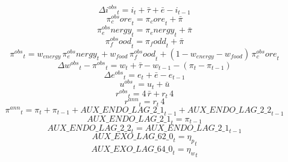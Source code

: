 \begin{dmath}
{{\Delta i^{obs}}}_{t}={{i}}_{t}+{{\bar{\tau}}}+{{\bar{e}}}-{{i}}_{t-1}
\end{dmath}
\begin{dmath}
{{\pi^{obs}_core}}_{t}={{\pi_core}}_{t}+{{\bar{\pi}}}
\end{dmath}
\begin{dmath}
{{\pi^{obs}_energy}}_{t}={{\pi_energy}}_{t}+{{\bar{\pi}}}
\end{dmath}
\begin{dmath}
{{\pi^{obs}_food}}_{t}={{\pi_fodd}}_{t}+{{\bar{\pi}}}
\end{dmath}
\begin{dmath}
{{\pi^{obs}}}_{t}={{w_{energy}}}\, {{\pi^{obs}_energy}}_{t}+{{w_{food}}}\, {{\pi^{obs}_food}}_{t}+\left(1-{{w_{energy}}}-{{w_{food}}}\right)\, {{\pi^{obs}_core}}_{t}
\end{dmath}
\begin{dmath}
{{\Delta w^{obs}}}_{t}-{{\pi^{obs}}}_{t}={{w}}_{t}+{{\bar{\tau}}}-{{w}}_{t-1}-\left({{\pi}}_{t}-{{\pi}}_{t-1}\right)
\end{dmath}
\begin{dmath}
{{\Delta e^{obs}}}_{t}={{e}}_{t}+{{\bar{e}}}-{{e}}_{t-1}
\end{dmath}
\begin{dmath}
{{u^{obs}}}_{t}={{u}}_{t}+{{\bar{u}}}
\end{dmath}
\begin{dmath}
{{r^{obs}}}_{t}=4\, {{\bar{r}}}+{{r}}_{t}\, 4
\end{dmath}
\begin{dmath}
{{r^{ann}}}_{t}={{r}}_{t}\, 4
\end{dmath}
\begin{dmath}
{{\pi^{ann}}}_{t}={{\pi}}_{t}+{{\pi}}_{t-1}+{AUX\_ENDO\_LAG\_2\_1}_{t-1}+{AUX\_ENDO\_LAG\_2\_2}_{t-1}
\end{dmath}
\begin{dmath}
{AUX\_ENDO\_LAG\_2\_1}_{t}={{\pi}}_{t-1}
\end{dmath}
\begin{dmath}
{AUX\_ENDO\_LAG\_2\_2}_{t}={AUX\_ENDO\_LAG\_2\_1}_{t-1}
\end{dmath}
\begin{dmath}
{AUX\_EXO\_LAG\_62\_0}_{t}={{\eta_p}}_{t}
\end{dmath}
\begin{dmath}
{AUX\_EXO\_LAG\_64\_0}_{t}={{\eta_w}}_{t}
\end{dmath}

